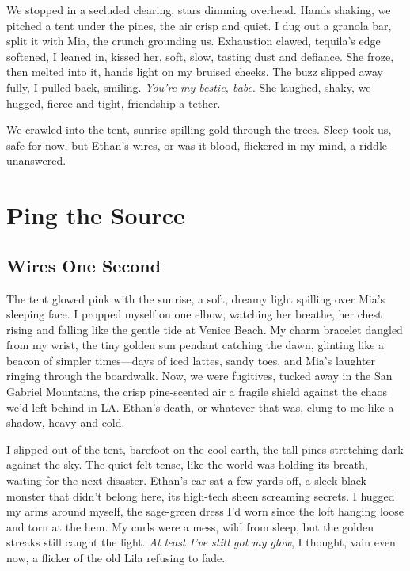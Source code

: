 \documentclass[12pt,oneside]{book} %
\begin{document}
We stopped in a secluded clearing, stars dimming overhead. Hands shaking, we pitched a tent under the pines, the air crisp and quiet. I dug out a granola bar, split it with Mia, the crunch grounding us. Exhaustion clawed, tequila’s edge softened, I leaned in, kissed her, soft, slow, tasting dust and defiance. She froze, then melted into it, hands light on my bruised cheeks. The buzz slipped away fully, I pulled back, smiling. \textit{You’re my bestie, babe}. She laughed, shaky, we hugged, fierce and tight, friendship a tether.

We crawled into the tent, sunrise spilling gold through the trees. Sleep took us, safe for now, but Ethan’s wires, or was it blood, flickered in my mind, a riddle unanswered.

\part{Ping the Source}

\chapter{Wires One Second}

The tent glowed pink with the sunrise, a soft, dreamy light spilling over Mia's sleeping face. I propped myself on one elbow, watching her breathe, her chest rising and falling like the gentle tide at Venice Beach. My charm bracelet dangled from my wrist, the tiny golden sun pendant catching the dawn, glinting like a beacon of simpler times—days of iced lattes, sandy toes, and Mia's laughter ringing through the boardwalk. Now, we were fugitives, tucked away in the San Gabriel Mountains, the crisp pine-scented air a fragile shield against the chaos we'd left behind in LA. Ethan's death, or whatever that was, clung to me like a shadow, heavy and cold.

I slipped out of the tent, barefoot on the cool earth, the tall pines stretching dark against the sky. The quiet felt tense, like the world was holding its breath, waiting for the next disaster. Ethan's car sat a few yards off, a sleek black monster that didn’t belong here, its high-tech sheen screaming secrets. I hugged my arms around myself, the sage-green dress I’d worn since the loft hanging loose and torn at the hem. My curls were a mess, wild from sleep, but the golden streaks still caught the light. \textit{At least I’ve still got my glow}, I thought, vain even now, a flicker of the old Lila refusing to fade.
\end{document}
